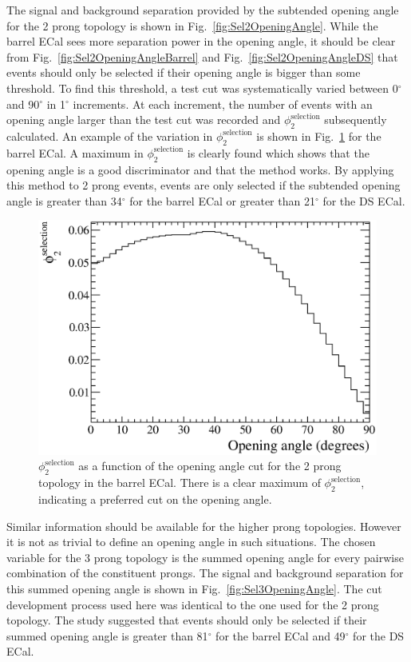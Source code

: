 The signal and background separation provided by the subtended opening angle for the 2 prong topology is shown in Fig.~\ref{fig:Sel2OpeningAngle}.  While the barrel ECal sees more separation power in the opening angle, it should be clear from Fig.~\ref{fig:Sel2OpeningAngleBarrel} and Fig.~\ref{fig:Sel2OpeningAngleDS} that events should only be selected if their opening angle is bigger than some threshold.  To find this threshold, a test cut was systematically varied between 0$^\circ$ and 90$^\circ$ in 1$^\circ$ increments.  At each increment, the number of events with an opening angle larger than the test cut was recorded and $\phi_2^{\textrm{selection}}$ subsequently calculated.  An example of the variation in $\phi_2^{\textrm{selection}}$ is shown in Fig.~\ref{fig:Sel2OpeningAngleBarrelFOM} for the barrel ECal.  A maximum in $\phi_2^{\textrm{selection}}$ is clearly found which shows that the opening angle is a good discriminator and that the method works.  By applying this method to 2 prong events, events are only selected if the subtended opening angle is greater than 34$^\circ$ for the barrel ECal or greater than 21$^\circ$ for the DS ECal.
\begin{figure}
  \centering
  \includegraphics[width=12cm]{images/selection/mc_selection/OpeningAngle_FOM_2Prong_Barrel.eps}
  \caption{$\phi_2^{\textrm{selection}}$ as a function of the opening angle cut for the 2 prong topology in the barrel ECal.  There is a clear maximum of $\phi_2^{\textrm{selection}}$, indicating a preferred cut on the opening angle.}
  \label{fig:Sel2OpeningAngleBarrelFOM}
\end{figure}
Similar information should be available for the higher prong topologies.  However it is not as trivial to define an opening angle in such situations.  The chosen variable for the 3 prong topology is the summed opening angle for every pairwise combination of the constituent prongs.  The signal and background separation for this summed opening angle is shown in Fig.~\ref{fig:Sel3OpeningAngle}.  The cut development process used here was identical to the one used for the 2 prong topology.  The study suggested that events should only be selected if their summed opening angle is greater than 81$^\circ$ for the barrel ECal and 49$^\circ$ for the DS ECal. 

